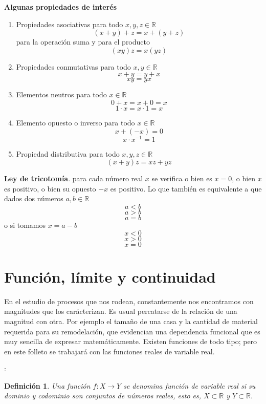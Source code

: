 \documentclass[10pt,twoside]{SelfArx} %
\begin{document}
\textbf{Algunas propiedades de interés}\\
\begin{enumerate}
	\item Propiedades asociativas para todo $ x,y,z\in \mathbb{R} $
	\[ (x+y)+z=x+(y+z) \]
	para la operación suma y para el producto
	\[ (xy)z=x(yz) \]
	\item Propiedades conmutativas para todo $ x,y\in \mathbb{R} $
	\[ x+y=y+x \]
	\[ xy=yx \]
	\item Elementos neutros para todo $ x\in \mathbb{R} $
	\[ 0+x=x+0=x \]
	\[ 1\cdot x=x\cdot 1=x \]
	\item Elemento opuesto o inverso para todo $ x\in \mathbb{R} $
	\[ x+(-x)=0 \]
	\[ x\cdot x^{-1}=1 \]
	\item Propiedad distributiva para todo $ x,y,z\in \mathbb{R} $
	\[ (x+y)z=xz+yz \]
\end{enumerate}
\textbf{Ley de tricotom\'ia}. para cada número real $ x $ se verifica o bien es $ x=0 $, o bien $ x $ es positivo, o bien su opuesto $ -x $ es positivo. Lo que también es equivalente a que dados dos números $ a,b\in \mathbb{R} $
\[ a<b \]
\[ a>b \]
\[ a=b \]
o si tomamos $ x=a-b $
\[ x<0 \]
\[ x>0 \]
\[ x=0 \]





\newpage
\section{Funci\'on, l\'imite y continuidad}

En el estudio de procesos que nos rodean, constantemente nos encontramos con magnitudes que los carácterizan. Es usual percatarse de la relación de una magnitud con otra. Por ejemplo el tamaño de una casa y la cantidad de material requerida para su remodelación, que evidencian una dependencia funcional que es muy sencilla de expresar matemáticamente. Existen funciones de todo tipo; pero en este folleto se trabajará con las funciones reales de variable real.\\


\newtheorem{thm}{Definici\'on}:
\begin{thm}\label{func_real}
	Una funci\'on $ f:X\rightarrow Y $ se denomina \textit{función de variable real } si su dominio y codominio son conjuntos de números reales, esto es, $ X\subset\mathbb{R} $ y $ Y\subset\mathbb{R} $.
\end{thm}
\end{document}
